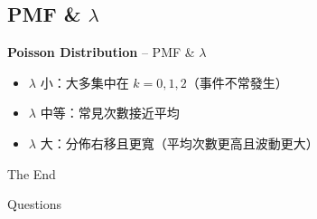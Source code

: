 \documentclass[12pt,aspectratio=43]{beamer}
\begin{document}
\subsection{PMF \& $\lambda$}
\begin{frame}[t]{\textbf{Poisson Distribution} -- PMF \& $\lambda$}
  \begin{itemize}
    \item $\lambda$ 小：大多集中在 $k=0,1,2$（事件不常發生）
    \item $\lambda$ 中等：常見次數接近平均
    \item $\lambda$ 大：分佈右移且更寬（平均次數更高且波動更大）
  \end{itemize}
  \begin{figure}
  \end{figure}
\end{frame}

\begin{frame}[plain] %
	\begin{center}
		{\Huge The End}
		\bigskip\bigskip 
		
		{\LARGE Questions}
	\end{center}
\end{frame}
\end{document}
